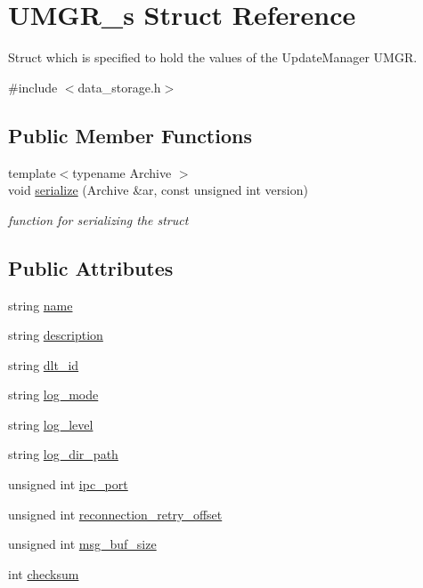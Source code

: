 \hypertarget{structUMGR__s}{}\section{U\+M\+G\+R\+\_\+s Struct Reference}
\label{structUMGR__s}


Struct which is specified to hold the values of the Update\+Manager U\+M\+GR.  




{\ttfamily \#include $<$data\+\_\+storage.\+h$>$}

\subsection*{Public Member Functions}
\begin{DoxyCompactItemize}
\item 
{\footnotesize template$<$typename Archive $>$ }\\void \hyperlink{structUMGR__s_af85ccf0554e33a7f7163c0d26ca791eb}{serialize} (Archive \&ar, const unsigned int version)
\begin{DoxyCompactList}\small\item\em function for serializing the struct \end{DoxyCompactList}\end{DoxyCompactItemize}
\subsection*{Public Attributes}
\begin{DoxyCompactItemize}
\item 
string \hyperlink{structUMGR__s_a3d36ca5f936e211da7645b00894c68dd}{name}
\item 
string \hyperlink{structUMGR__s_a80540aaa70f1333ba3c558f6af7a39a1}{description}
\item 
string \hyperlink{structUMGR__s_a0a329d092b37dd9061136642d6bebd15}{dlt\+\_\+id}
\item 
string \hyperlink{structUMGR__s_ab9ebb2767a511f0e791ae1f07b2a03e2}{log\+\_\+mode}
\item 
string \hyperlink{structUMGR__s_a59eaa08e65bbab14ab1deb4969a261c3}{log\+\_\+level}
\item 
string \hyperlink{structUMGR__s_ae8d842a1050f74d35c2785f9d72f7197}{log\+\_\+dir\+\_\+path}
\item 
unsigned int \hyperlink{structUMGR__s_a9024c1140605de70cf368de635024702}{ipc\+\_\+port}
\item 
unsigned int \hyperlink{structUMGR__s_af846433f5bfd716a224c3cf7ac208fdb}{reconnection\+\_\+retry\+\_\+offset}
\item 
unsigned int \hyperlink{structUMGR__s_aa3ce6d48e8db2d85e084d079548b8338}{msg\+\_\+buf\+\_\+size}
\item 
int \hyperlink{structUMGR__s_a3a98cb14c2b8c9545aa47871865076e6}{checksum}
\end{DoxyCompactItemize}



